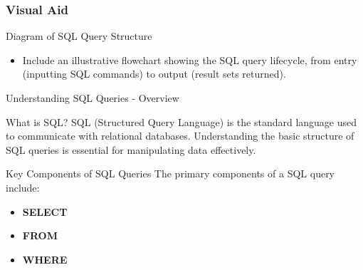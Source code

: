 \documentclass[aspectratio=169]{beamer}
\begin{document}
\begin{frame}[fragile]
    \frametitle{Visual Aid}
    \begin{block}{Diagram of SQL Query Structure}
        \begin{itemize}
            \item Include an illustrative flowchart showing the SQL query lifecycle, 
            from entry (inputting SQL commands) to output (result sets returned).
        \end{itemize}
    \end{block}
\end{frame}

\begin{frame}[fragile]{Understanding SQL Queries - Overview}
    \begin{block}{What is SQL?}
        SQL (Structured Query Language) is the standard language used to communicate with relational databases. 
        Understanding the basic structure of SQL queries is essential for manipulating data effectively.
    \end{block}
    \begin{block}{Key Components of SQL Queries}
        The primary components of a SQL query include:
        \begin{itemize}
            \item \textbf{SELECT}
            \item \textbf{FROM}
            \item \textbf{WHERE}
        \end{itemize}
    \end{block}
\end{frame}
\end{document}
